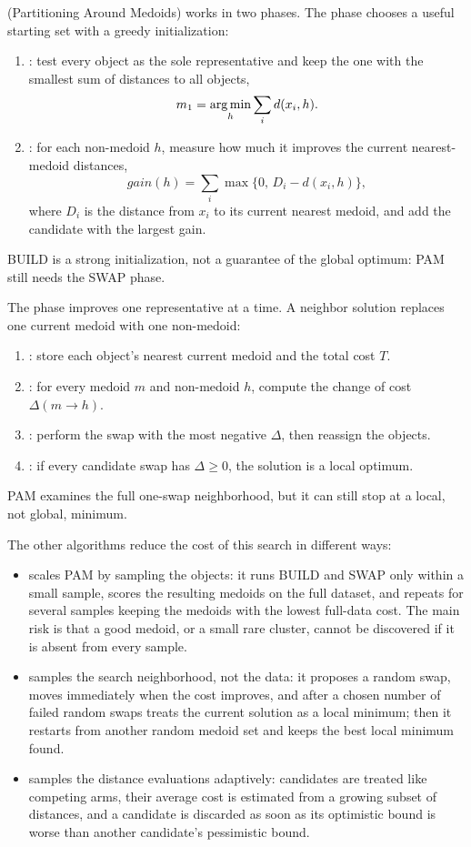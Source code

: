  (Partitioning Around Medoids) works in two phases. The  phase chooses a useful starting set with a greedy initialization:
\begin{enumerate}
  \item {}: test every object as the sole representative and keep the one with the smallest sum of distances to all objects,
  \[
    m_1 = \operatorname*{arg\,min}_{h} \sum_{i} d(x_i, h).
  \]
  \item {}: for each non-medoid $h$, measure how much it improves the current nearest-medoid distances,
  \[
    gain(h) = \sum_{i} \max\{0,\, D_i - d(x_i, h)\},
  \]
  where $D_i$ is the distance from $x_i$ to its current nearest medoid, and add the candidate with the largest gain.
\end{enumerate}
BUILD is a strong initialization, not a guarantee of the global optimum: PAM still needs the SWAP phase.

The  phase improves one representative at a time. A neighbor solution replaces one current medoid with one non-medoid:
\begin{enumerate}
  \item {}: store each object's nearest current medoid and the total cost $T$.
  \item {}: for every medoid $m$ and non-medoid $h$, compute the change of cost $\Delta(m \to h)$.
  \item {}: perform the swap with the most negative $\Delta$, then reassign the objects.
  \item {}: if every candidate swap has $\Delta \ge 0$, the solution is a local optimum.
\end{enumerate}
PAM examines the full one-swap neighborhood, but it can still stop at a local, not global, minimum.

The other algorithms reduce the cost of this search in different ways:
\begin{itemize}
  \item {} scales PAM by sampling the objects: it runs BUILD and SWAP only within a small sample, scores the resulting medoids on the full dataset, and repeats for several samples keeping the medoids with the lowest full-data cost. The main risk is that a good medoid, or a small rare cluster, cannot be discovered if it is absent from every sample.
  \item {} samples the search neighborhood, not the data: it proposes a random swap, moves immediately when the cost improves, and after a chosen number of failed random swaps treats the current solution as a local minimum; then it restarts from another random medoid set and keeps the best local minimum found.
  \item {} samples the distance evaluations adaptively: candidates are treated like competing arms, their average cost is estimated from a growing subset of distances, and a candidate is discarded as soon as its optimistic bound is worse than another candidate's pessimistic bound.
\end{itemize}

